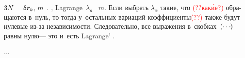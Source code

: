 \begin{otherlanguage}{russian}
\vspace{-0.1em}\noindent
{}
${3N \hspace{-0.2ex}}$~
~${\variation{\hspace{.1ex}\locationvector_{\hspace{-0.1ex}k}}}$,
$m$~.
,
%
Lagrange~$\lambda_{a}$
~$m$.
%
Если выбрать $\lambda_{\alpha}$
такие, что
\textcolor{red}{(??как\'{и}е?)}
обращаются в~нуль,
то тогда
у~остальных вариаций
коэффициенты\textcolor{red}{(??)}
также будут нулевые
из\hbox{-}за независимости.
Следовательно,
все выражения
в~скобках~${(\cdots\hspace{-0.2ex})}$
равны нулю\:---
это и~есть
Lagrange’
.


...



\end{otherlanguage}

